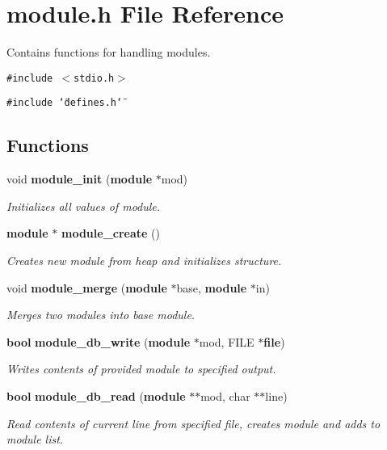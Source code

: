 \section{module.h File Reference}
\label{module_8h}
Contains functions for handling modules. 


{\tt \#include $<$stdio.h$>$}\par
{\tt \#include \char`\"{}defines.h\char`\"{}}\par
\subsection*{Functions}
\begin{CompactItemize}
\item 
void {\bf module\_\-init} ({\bf module} $\ast$mod)
\begin{CompactList}\small\item\em Initializes all values of module.\item\end{CompactList}\item 
{\bf module} $\ast$ {\bf module\_\-create} ()
\begin{CompactList}\small\item\em Creates new module from heap and initializes structure.\item\end{CompactList}\item 
void {\bf module\_\-merge} ({\bf module} $\ast$base, {\bf module} $\ast$in)
\begin{CompactList}\small\item\em Merges two modules into base module.\item\end{CompactList}\item 
{\bf bool} {\bf module\_\-db\_\-write} ({\bf module} $\ast$mod, FILE $\ast${\bf file})
\begin{CompactList}\small\item\em Writes contents of provided module to specified output.\item\end{CompactList}\item 
{\bf bool} {\bf module\_\-db\_\-read} ({\bf module} $\ast$$\ast$mod, char $\ast$$\ast$line)
\begin{CompactList}\small\item\em Read contents of current line from specified file, creates module and adds to module list.\item\end{CompactList}\item 

\end{CompactItemize}
